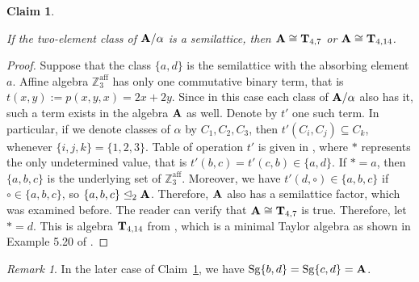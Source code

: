\documentclass[11pt]{amsart}
\newcommand{\m}[1]{\mathbf{\uppercase{#1}}}
\theoremstyle{definition}
\theoremstyle{remark}
\newtheorem*{rem}{Remark}
\theoremstyle{plain}
\newtheorem{claim}[thm]{Claim}
\begin{document}
\begin{claim}\label{claim3affsemiblock}

If the two-element class of $\m a/\alpha$ is a semilattice, then  $\m a\cong\m t_{4,7}$ or $\m a\cong\m t_{4,14}$.
\end{claim}
\begin{proof}
Suppose that the class $\{a,d\}$ is the semilattice with the absorbing element $a$. Affine algebra $\mathbb{Z}^{\text{aff}}_3$ has only one commutative binary term, that is $t(x,y):=p(x,y,x)=2x+2y$. Since in this case each class of $\m a/\alpha$ also has it, such a term exists in the algebra $\m a$ as well. Denote by $t'$ one such term.
In particular, if we denote classes of $\alpha$ by $C_1,C_2,C_3$, then $t'(C_i,C_j)\subseteq C_k$, whenever $\{i,j,k\}=\{1,2,3\}$. Table of operation $t'$ is given in , where $\ast$ represents the only undetermined value, that is $t'(b,c)=t'(c,b)\in\{a,d\}$. 
If $\ast=a$, then $\{a,b,c\}$ is the underlying set of $\mathbb{Z}^{\text{aff}}_3$. Moreover, we have $t'(d,\circ)\in\{a,b,c\}$ if $\circ\in\{a,b,c\}$, so $\{a,b,c\}\trianglelefteq_2\m a$. Therefore, $\m a$ also has a semilattice factor, which was examined before. The reader can verify that $\m a\cong\m t_{4,7}$ is true. Therefore, let $\ast=d$. This is algebra $\m t_{4,14}$ from , which is a minimal Taylor algebra as shown in Example 5.20 of \cite{dreamteam}.
\end{proof}
\begin{rem}
In the later case of Claim~\ref{claim3affsemiblock}, we have $\mathrm{Sg}\{b,d\}=\mathrm{Sg}\{c,d\}=\m a$.
\end{rem}
\end{document}

